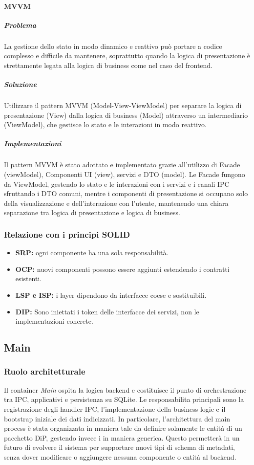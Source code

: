     \paragraph{MVVM}
    \subparagraph{Problema}
        La gestione dello stato in modo dinamico e reattivo può portare a codice complesso e difficile da mantenere, soprattutto quando la logica di presentazione è strettamente legata alla logica di business come nel caso del frontend.
    \subparagraph{Soluzione}
        Utilizzare il pattern MVVM (Model-View-ViewModel) per separare la logica di presentazione (View) dalla logica di business (Model) attraverso un intermediario (ViewModel), che gestisce lo stato e le interazioni in modo reattivo.
    \subparagraph{Implementazioni}
        Il pattern MVVM è stato adottato e implementato grazie all'utilizzo di Facade (viewModel), Componenti UI (view), servizi e DTO (model). Le Facade fungono da ViewModel, gestendo lo stato e le interazioni con i servizi e i canali IPC sfruttando i DTO comuni, mentre i componenti di presentazione si occupano solo della visualizzazione e dell'interazione con l'utente, mantenendo una chiara separazione tra logica di presentazione e logica di business.

\subsubsection{Relazione con i principi SOLID}
\begin{itemize}
    \item \textbf{SRP:} ogni componente ha una sola responsabilità.
    \item \textbf{OCP:} nuovi componenti possono essere aggiunti estendendo i contratti esistenti.
    \item \textbf{LSP e ISP:} i layer dipendono da interfacce coese e sostituibili. 
    \item \textbf{DIP:} Sono iniettati i token delle interfacce dei servizi, non le implementazioni concrete.
\end{itemize}

\subsection{Main}
\label{sec:container:main}

\subsubsection{Ruolo architetturale}
Il container \textit{Main} ospita la logica backend e costituisce il punto di orchestrazione tra IPC,  applicativi e persistenza su SQLite.
Le responsabilita principali sono la registrazione degli handler IPC, l'implementazione della business logic e il bootstrap iniziale dei dati indicizzati.
In particolare, l'architettura del main process è stata organizzata in maniera tale da definire solamente le entità di un pacchetto DiP, gestendo invece i  in maniera generica. Questo permetterà in un futuro di evolvere il sistema per supportare nuovi tipi di schema di metadati, senza dover modificare o aggiungere nessuna componente o entità al backend.

